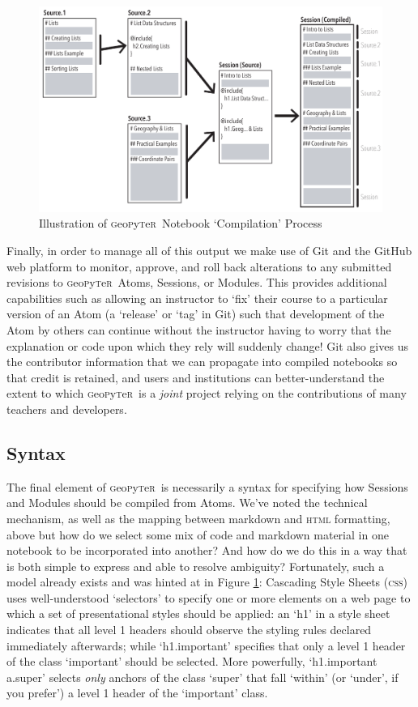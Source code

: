 \documentclass[letter, 11pt]{article}
\newcommand{\gp}{\textsc{g}eo\textsc{p}y\textsc{t}e\textsc{r}~\/}
\begin{document}
\begin{figure}[hbtp]
  \centering
  \includegraphics[width=\textwidth, angle=0]{Illustration.pdf}
  \caption{Illustration of \gp Notebook `Compilation' Process}
  \label{fig:Illustration}
\end{figure}

Finally, in order to manage all of this output we make use of Git and the GitHub web platform to monitor, approve, and roll back alterations to any submitted revisions to \gp Atoms, Sessions, or Modules. This provides additional capabilities such as allowing an instructor to `fix' their course to a particular version of an Atom (a `release' or `tag' in Git) such that development of the Atom by others can continue without the instructor having to worry that the explanation or code upon which they rely will suddenly change! Git also gives us the contributor information that we can propagate into compiled notebooks so that credit is retained, and users and institutions can better-understand the extent to which \gp is a \emph{joint} project relying on the contributions of many teachers and developers.

\subsection{Syntax}\label{syntax}

The final element of \gp is necessarily a syntax for specifying how Sessions and Modules should be compiled from Atoms. We've noted the technical mechanism, as well as the mapping between markdown and \textsc{html} formatting, above but how do we select some mix of code and markdown material in one notebook to be incorporated into another? And how do we do this in a way that is both simple to express and able to resolve ambiguity? Fortunately, such a model already exists and was hinted at in Figure \ref{fig:Illustration}: Cascading Style Sheets (\textsc{css}) uses well-understood `selectors' to specify one or more elements on a web page to which a set of presentational styles should be applied: an `h1' in a style sheet indicates that all level 1 headers should observe the styling rules declared immediately afterwards; while `h1.important' specifies that only a level 1 header of the class `important' should be selected. More powerfully, `h1.important a.super' selects \emph{only} anchors of the class `super' that fall `within' (or `under', if you prefer') a level 1 header of the `important' class.
\end{document}
